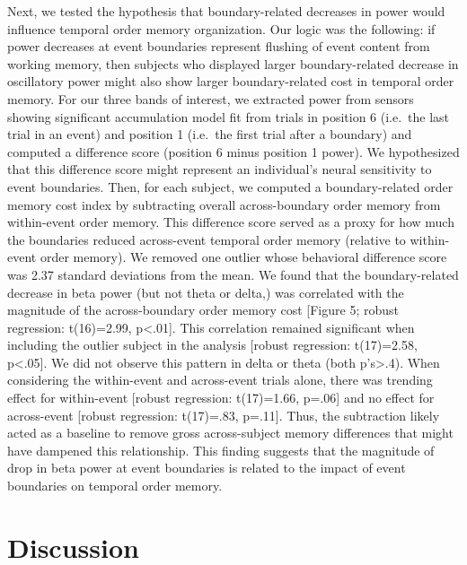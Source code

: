 Next, we tested the hypothesis that boundary-related decreases in power
would influence temporal order memory organization. Our logic was the
following: if power decreases at event boundaries represent flushing of
event content from working memory, then subjects who displayed larger
boundary-related decrease in oscillatory power might also show larger
boundary-related cost in temporal order memory. For our three bands of
interest, we extracted power from sensors showing significant
accumulation model fit from trials in position 6 (i.e.~the last trial in
an event) and position 1 (i.e.~the first trial after a boundary) and
computed a difference score (position 6 minus position 1 power). We
hypothesized that this difference score might represent an individual's
neural sensitivity to event boundaries. Then, for each subject, we
computed a boundary-related order memory cost index by subtracting
overall across-boundary order memory from within-event order memory.
This difference score served as a proxy for how much the boundaries
reduced across-event temporal order memory (relative to within-event
order memory). We removed one outlier whose behavioral difference score
was 2.37 standard deviations from the mean. We found that the
boundary-related decrease in beta power (but not theta or delta,) was
correlated with the magnitude of the across-boundary order memory cost
{[}Figure 5; robust regression: t(16)=2.99, p\textless{}.01{]}. This
correlation remained significant when including the outlier subject in
the analysis {[}robust regression: t(17)=2.58, p\textless{}.05{]}. We
did not observe this pattern in delta or theta (both
p's\textgreater{}.4). When considering the within-event and across-event
trials alone, there was trending effect for within-event {[}robust
regression: t(17)=1.66, p=.06{]} and no effect for across-event
{[}robust regression: t(17)=.83, p=.11{]}. Thus, the subtraction likely
acted as a baseline to remove gross across-subject memory differences
that might have dampened this relationship. This finding suggests that
the magnitude of drop in beta power at event boundaries is related to
the impact of event boundaries on temporal order memory.

\section{Discussion}\label{discussion}

